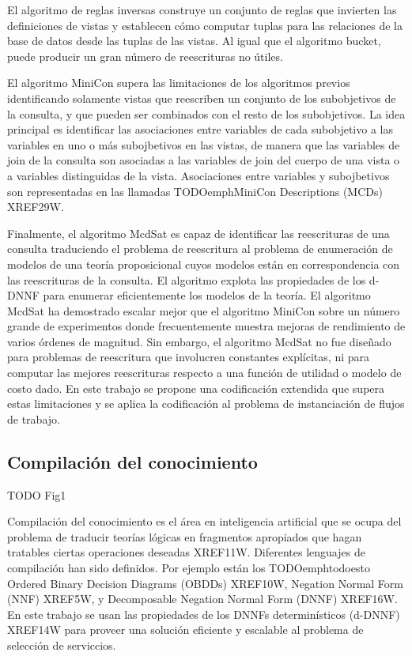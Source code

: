 \documentclass{article}
\begin{document}
El algoritmo de reglas inversas construye un conjunto de reglas que invierten
las definiciones de vistas y establecen cómo computar tuplas para las relaciones
de la base de datos desde las tuplas de las vistas. Al igual que el algoritmo
bucket, puede producir un gran número de reescrituras no útiles.

El algoritmo MiniCon supera las limitaciones de los algoritmos previos
identificando solamente vistas que reescriben un conjunto de los subobjetivos de
la consulta, y que pueden ser combinados con el resto de los subobjetivos. La
idea principal es identificar las asociaciones entre variables de cada
subobjetivo a las variables en uno o más subojbetivos en las vistas, de manera
que las variables de join de la consulta son asociadas a las variables de join
del cuerpo de una vista o a variables distinguidas de la vista. Asociaciones
entre variables y subojbetivos son representadas en las llamadas TODOemphMiniCon
Descriptions (MCDs) XREF29W.

Finalmente, el algoritmo McdSat es capaz de identificar las reescrituras de una
consulta traduciendo el problema de reescritura al problema de enumeración de
modelos de una teoría proposicional cuyos modelos están en correspondencia con
las reescrituras de la consulta. El algoritmo explota las propiedades de los
d-DNNF para enumerar eficientemente los modelos de la teoría. El algoritmo
McdSat ha demostrado escalar mejor que el algoritmo MiniCon sobre un número
grande de experimentos donde frecuentemente muestra mejoras de rendimiento de
varios órdenes de magnitud. Sin embargo, el algoritmo McdSat no fue diseñado
para problemas de reescritura que involucren constantes explícitas, ni para
computar las mejores reescrituras respecto a una función de utilidad o modelo de
costo dado. En este trabajo se propone una codificación extendida que supera
estas limitaciones y se aplica la codificación al problema de instanciación de
flujos de trabajo.

\subsection{Compilación del conocimiento}
TODO Fig1

Compilación del conocimiento es el área en inteligencia artificial que se ocupa
del problema de traducir teorías lógicas en fragmentos apropiados que hagan
tratables ciertas operaciones deseadas XREF11W. Diferentes lenguajes de
compilación han sido definidos. Por ejemplo están los TODOemphtodoesto Ordered
Binary Decision Diagrams (OBDDs) XREF10W, Negation Normal Form (NNF) XREF5W, y
Decomposable Negation Normal Form (DNNF) XREF16W. En este trabajo se usan las
propiedades de los DNNFs determinísticos (d-DNNF) XREF14W para proveer una
solución eficiente y escalable al problema de selección de serviccios.
\end{document}
